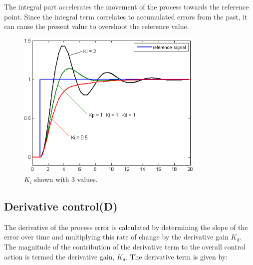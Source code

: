 The integral part accelerates the movement of the process towards the reference point.
Since the integral term correlates to accumulated errors from the past, it can cause the present value to overshoot the reference value.
\begin{figure}[h!]
  \centering
  \includegraphics[width=0.8\textwidth]{figures/Change_with_Ki.png}
  
  \caption{$K_i$ shown with 3 values.} 
  \label{PID controller}
\end{figure}

\newpage

\subsection {Derivative control(D)} 
The derivative of the process error is calculated by determining the slope of the error over time and multiplying this rate of change by the derivative gain $K_d$. The magnitude of the contribution of the derivative term to the overall control action is termed the derivative gain, $K_d$. The derivative term is given by:


